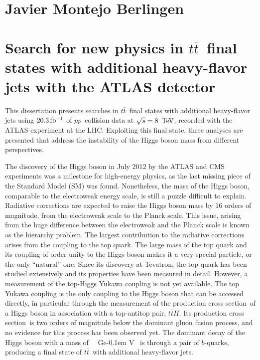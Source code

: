 \documentclass{article}
\def\ttH{\ensuremath{t\bar{t}H}}
\def\ttbar{\ensuremath{t\bar{t}}}
\def\xsec{cross section} %
\def\gev{\ifmmode {\mathrm{\ Ge\kern -0.1em V}}\else
                   \textrm{Ge\kern -0.1em V}\fi}%
\def\tev{\ifmmode {\mathrm{\ Te\kern -0.1em V}}\else
                   \textrm{Te\kern -0.1em V}\fi}%
\def\pp{\ensuremath{pp}}
\begin{document}
\section*{\huge{Javier Montejo Berlingen}}
\section*{Search for new physics in \ttbar\ final states with additional heavy-flavor jets with the ATLAS detector}
\vspace{0.5cm}

This dissertation presents searches in \ttbar\ final states with additional heavy-flavor jets using $\unit[20.3]{fb^{-1}}$ of \pp\ collision data at 
$\sqrt{s} = \unit[8]{\tev}$, recorded with the ATLAS experiment at the LHC. 
Exploiting this final state, three analyses are presented that address the
instability of the Higgs boson mass from different perspectives.
\newline

The discovery of the Higgs boson in July 2012 by the ATLAS and CMS experiments was a milestone for high-energy physics, as the last missing piece of the Standard Model (SM) was found.
Nonetheless, the mass of the Higgs boson, comparable to the electroweak energy scale, is still a puzzle difficult to explain. Radiative corrections are expected to raise the Higgs boson mass by 16 orders of magnitude, from the electroweak scale to the Planck scale. This issue,
arising from the huge difference between the electroweak and the Planck scale is known as the hierarchy problem.
The largest contribution to the radiative corrections arises from the coupling to the top quark. The large mass of the top quark and its coupling of order unity to the Higgs boson makes it a very special particle, or the only ``natural'' one. Since its discovery at Tevatron, the top quark has been studied extensively and its properties have been measured in detail.
However, a measurement of the top-Higgs Yukawa coupling is not yet available.
The top Yukawa coupling is the only coupling to the Higgs boson that can be accessed directly, in particular through the measurement of the production \xsec\ of a Higgs boson in association with a top-antitop pair, \ttH. Its production \xsec\ is two orders of magnitude below the dominant gluon fusion process, and no evidence for this process has been observed yet. The dominant decay of the Higgs boson with a mass of \unit[125]{\gev} is through a pair of $b$-quarks, producing a final state of \ttbar\ with additional heavy-flavor jets.
\end{document}
